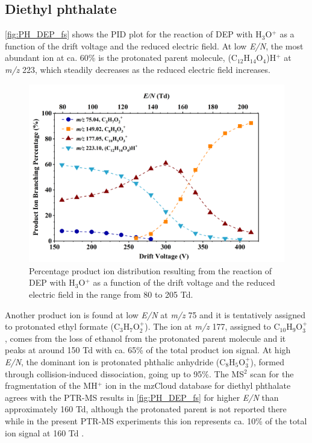 \subsection{Diethyl phthalate}


\autoref{fig:PH_DEP_fs} shows the PID plot for the reaction of DEP with H$_3$O$^+$ as a function of the drift voltage and the reduced electric field.
At low \textit{E/N}, the most abundant ion at ca. 60\% is the protonated parent molecule, (C$_{12}$H$_{14}$O$_4$)H$^+$  at \textit{m/z} 223, which steadily decreases as the reduced electric field increases.
%
\begin{figure}[htb]%
\centering
\includegraphics[height=0.4\textheight]{pics/DEP-BR.png}
\caption{Percentage product ion distribution resulting from the reaction of DEP with H$_3$O$^+$ as a function of the drift voltage and the reduced electric field in the range from 80 to 205 Td.}
\label{fig:PH_DEP_fs}
\end{figure}
%
Another product ion is found at low \textit{E/N} at \textit{m/z} 75 and it is tentatively assigned to protonated ethyl formate (C$_3$H$_{7}$O$_2^+$).
The ion at \textit{m/z} 177, assigned to C$_{10}$H$_{9}$O$_3^+$, comes from the loss of ethanol from the protonated parent molecule and it peaks at around 150 Td with ca. 65\% of the total product ion signal.
At high \textit{E/N}, the dominant ion is protonated phthalic anhydride (C$_8$H$_{5}$O$_3^+$), formed through collision-induced dissociation, going up to 95\%. %
%
The MS$^2$ scan for the fragmentation of the MH$^+$ ion in the mzCloud database for diethyl phthalate agrees with the PTR-MS results in \autoref{fig:PH_DEP_fs} for higher \textit{E/N} than approximately 160 Td, although the protonated parent is not reported there while in the present PTR-MS experiments this ion represents ca. 10\% of the total ion signal at 160 Td
\cite{mzcloudDEP}.





